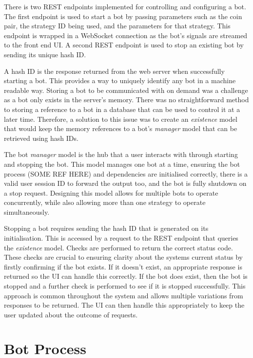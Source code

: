\noindent There is two REST endpoints implemented for controlling and configuring a bot. The first endpoint is used to start a bot by passing parameters such as the coin pair, the strategy ID being used, and the parameters for that strategy. This endpoint is wrapped in a WebSocket connection as the bot's signals are streamed to the front end UI. A second REST endpoint is used to stop an existing bot by sending its unique hash ID.

A hash ID is the response returned from the web server when successfully starting a bot. This provides a way to uniquely identify any bot in a machine readable way. Storing a bot to be communicated with on demand was a challenge as a bot only exists in the server's memory. There was no straightforward method to storing a reference to a bot in a database that can be used to control it at a later time. Therefore, a solution to this issue was to create an \textit{existence} model that would keep the memory references to a bot's \textit{manager} model that can be retrieved using hash IDs.

The bot \textit{manager} model is the hub that a user interacts with through starting and stopping the bot. This model manages one bot at a time, ensuring the bot process (SOME REF HERE) and dependencies are initialised correctly, there is a valid user session ID to forward the output too, and the bot is fully shutdown on a stop request. Designing this model allows for multiple bots to operate concurrently, while also allowing more than one strategy to operate simultaneously.

Stopping a bot requires sending the hash ID that is generated on its initialisation. This is accessed by a request to the REST endpoint that queries the \textit{existence} model. Checks are performed to return the correct status code. These checks are crucial to ensuring clarity about the systems current status by firstly confirming if the bot exists. If it doesn't exist, an appropriate response is returned so the UI can handle this correctly. If the bot does exist, then the bot is stopped and a further check is performed to see if it is stopped successfully. This approach is common throughout the system and allows multiple variations from responses to be returned. The UI can then handle this appropriately to keep the user updated about the outcome of requests.

\section{Bot Process}
\label{sec:implementation:bot}

